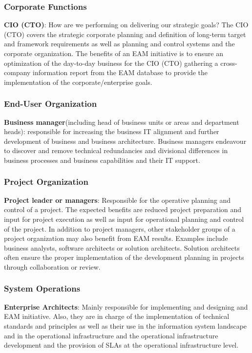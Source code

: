 \subsubsection{Corporate Functions}
\textbf{CIO (CTO)}: How are we performing on delivering our strategic goals? The CIO (CTO) covers the strategic corporate planning and definition of long-term target and framework requirements as well as planning and control systems and the corporate organization. The benefits of an EAM initiative is to ensure an optimization of the day-to-day business for the CIO (CTO) gathering a cross-company information report from the EAM database to provide the implementation of the corporate/enterprise goals. \cite{Hanschke2011}

\subsubsection{End-User Organization}
\textbf{Business manager}(including head of business units or areas and department heads): responsible for increasing the business IT alignment and further development of business and business architecture. Business managers endeavour to discover and remove technical redundancies and divisional differences in business processes and business capabilities and their IT support. \cite{Hanschke2011}

\subsubsection{Project Organization}
\textbf{Project leader or managers}: Responsible for the operative planning and control of a project. The expected benefits are reduced project preparation and input for project execution as well as input for operational planning and control of the project.
In addition to project managers, other stakeholder groups of a project organization may also benefit from EAM results. Examples include business analysts, software architects or solution architects. Solution architects often ensure the proper implementation of the development planning in projects through collaboration or review. \cite{Hanschke2011}

\subsubsection{System Operations}
\textbf{Enterprise Architects}: Mainly responsible for implementing and designing and EAM initiative. Also, they are in charge of the implementation of technical standards and principles as well as their use in the information system landscape and in the operational infrastructure and the operational infrastructure development and the provision of SLAs at the operational infrastructure level. \cite{Hanschke2011}


